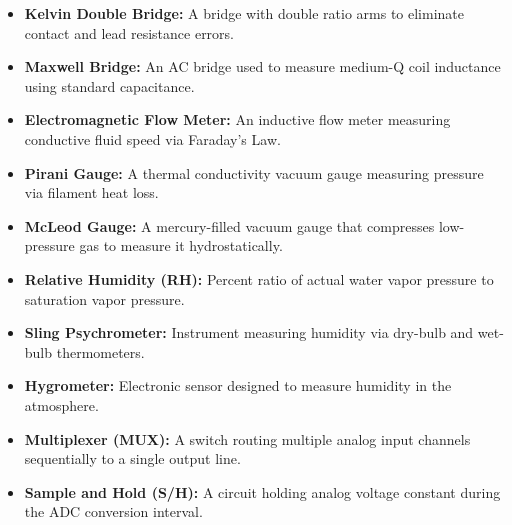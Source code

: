 \documentclass[12pt,a4paper]{article}
\begin{document}
\begin{tcolorbox}[defbox, title={\textbf{One-Line Definitions}}]
\begin{itemize}[leftmargin=*, itemsep=2.5pt, topsep=0pt]
  \item \textbf{Kelvin Double Bridge:} A bridge with double ratio arms to eliminate contact and lead resistance errors.
  \item \textbf{Maxwell Bridge:} An AC bridge used to measure medium-Q coil inductance using standard capacitance.
  \item \textbf{Electromagnetic Flow Meter:} An inductive flow meter measuring conductive fluid speed via Faraday's Law.
  \item \textbf{Pirani Gauge:} A thermal conductivity vacuum gauge measuring pressure via filament heat loss.
  \item \textbf{McLeod Gauge:} A mercury-filled vacuum gauge that compresses low-pressure gas to measure it hydrostatically.
  \item \textbf{Relative Humidity (RH):} Percent ratio of actual water vapor pressure to saturation vapor pressure.
  \item \textbf{Sling Psychrometer:} Instrument measuring humidity via dry-bulb and wet-bulb thermometers.
  \item \textbf{Hygrometer:} Electronic sensor designed to measure humidity in the atmosphere.
  \item \textbf{Multiplexer (MUX):} A switch routing multiple analog input channels sequentially to a single output line.
  \item \textbf{Sample and Hold (S/H):} A circuit holding analog voltage constant during the ADC conversion interval.
\end{itemize}
\end{tcolorbox}
\end{document}
